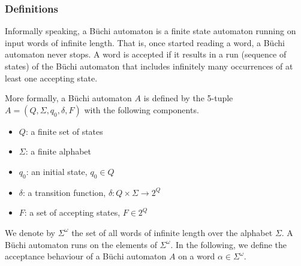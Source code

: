 \subsubsection{Definitions}
Informally speaking, a Büchi automaton is a finite state automaton running on input words of infinite length. That is, once started reading a word, a Büchi automaton never stops. A word is accepted if it results in a run (sequence of states) of the Büchi automaton that includes infinitely many occurrences of at least one accepting state.

More formally, a Büchi automaton $A$ is defined by the 5-tuple $A = (Q, \Sigma, q_0, \delta, F)$ with the following components.
\begin{itemize}
\item $Q$: a finite set of states
\item $\Sigma$: a finite alphabet
\item $q_0$: an initial state, $q_0 \in Q$
\item $\delta$: a transition function, $\delta: Q \times \Sigma \rightarrow 2^Q$ %
\item $F$: a set of accepting states, $F \in 2^Q$
\end{itemize}

We denote by $\Sigma^\omega$ the set of all words of infinite length over the alphabet $\Sigma$. A Büchi automaton runs on the elements of $\Sigma^\omega$. In the following, we define the acceptance behaviour of a Büchi automaton $A$ on a word $\alpha \in \Sigma^\omega$.



